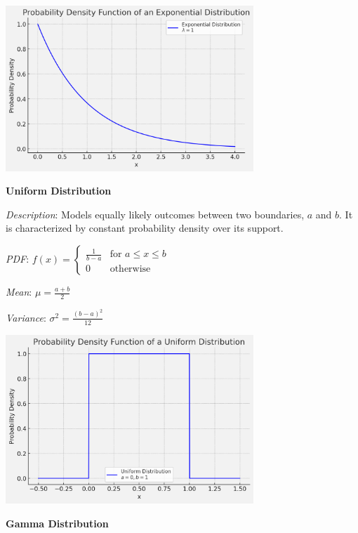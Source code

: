 \documentclass{article}
\begin{document}
\begin{multicols}{2}
\begin{mdframed}
\begin{center}
  \includegraphics*[width=0.7\textwidth]{exponential.png}
\end{center}

\end{mdframed}

\begin{mdframed}
  \textbf{Uniform Distribution}
  
  \textit{Description}: Models equally likely outcomes between two boundaries, $a$ and $b$. It is characterized by constant probability density over its support.
  
  \textit{PDF}: $f(x) = \begin{cases} 
    \frac{1}{b-a} & \text{for } a \leq x \leq b \\
    0 & \text{otherwise}
  \end{cases}$
  
  \textit{Mean}: $\mu = \frac{a + b}{2}$
  
  \textit{Variance}: $\sigma^2 = \frac{(b-a)^2}{12}$
  
  \begin{center}
    \includegraphics*[width=0.7\textwidth]{uniform.png}
  \end{center}
  
\end{mdframed}
\begin{mdframed}
    \textbf{Gamma Distribution}
    

\end{mdframed}
\end{multicols}
\end{document}
